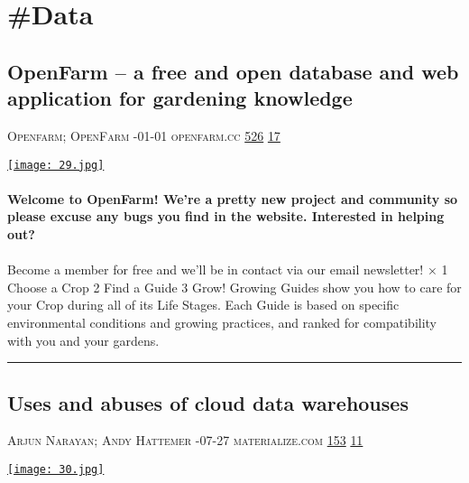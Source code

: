 \documentclass[10pt,a4paper]{article}
\begin{document}
\newpage
\section{\#Data}

\begin{multicols}{2}

\noindent\begin{minipage}{\linewidth}
\subsection{OpenFarm – a free and open database and web application for gardening knowledge}
\textsc{\footnotesize
{\scriptsize\faUser}\space 
Openfarm; OpenFarm 
{\scriptsize\faCalendar}-01-01 
{\scriptsize\faGlobe}\space 
openfarm.cc 
{\scriptsize\faThumbsOUp}\space 
\href{http://news.ycombinator.com/item?id=37125830\&utm\_term=comment}{526} 
{\scriptsize\faComments}\space 
\href{http://news.ycombinator.com/item?id=37125830\&utm\_term=comment}{17} 
}
\par\medskip\noindent
\href{https://openfarm.cc?utm\_source=hackernewsletter\&utm\_medium=email\&utm\_term=data}{
    \texttt{[image: 29.jpg]}
}
\end{minipage}
\paragraph{}
\textbf{Welcome to OpenFarm! We're a pretty new project and community so please excuse any bugs you find in the website. Interested in helping out?}
\paragraph{}
 Become a member for free and we'll be in contact via our email newsletter!
×
1
Choose a Crop
2
Find a Guide
3
Grow!
Growing Guides show you how to care for your Crop during all
of its Life Stages. Each Guide is based on specific environmental
conditions and growing practices, and ranked for compatibility
with you and your gardens.
\par\noindent\textcolor{red}{\rule{\linewidth}{0.2mm}}
\vfill
\null
\noindent\begin{minipage}{\linewidth}
\subsection{Uses and abuses of cloud data warehouses}
\textsc{\footnotesize
{\scriptsize\faUser}\space 
Arjun Narayan; Andy Hattemer 
{\scriptsize\faCalendar}-07-27 
{\scriptsize\faGlobe}\space 
materialize.com 
{\scriptsize\faThumbsOUp}\space 
\href{http://news.ycombinator.com/item?id=37146532\&utm\_term=comment}{153} 
{\scriptsize\faComments}\space 
\href{http://news.ycombinator.com/item?id=37146532\&utm\_term=comment}{11} 
}
\par\medskip\noindent
\href{https://materialize.com/blog/warehouse-abuse/?utm\_source=hackernewsletter\&utm\_medium=email\&utm\_term=data}{
    \texttt{[image: 30.jpg]}
}
\end{minipage}

\end{multicols}
\end{document}
